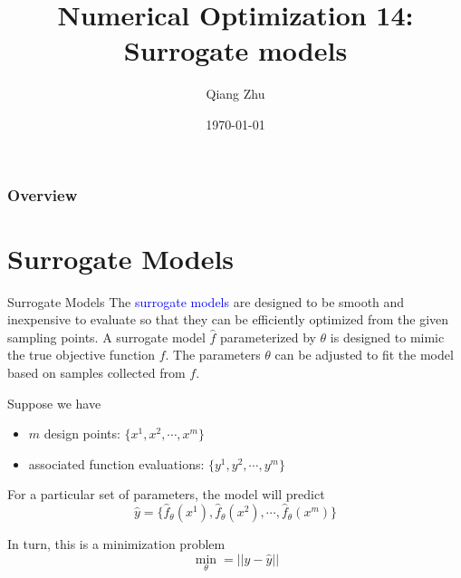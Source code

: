 \documentclass{beamer}
\title[Surrogate models]{Numerical Optimization 14: Surrogate models} %
\author{Qiang Zhu} %
\institute[University of Nevada Las Vegas] %
{
University of Nevada Las Vegas\\ %
\medskip
}
\date{\today} %
\begin{document}
\begin{frame}
\titlepage %
\end{frame}

\begin{frame}
\frametitle{Overview} %
\tableofcontents %
\end{frame}



\section{Surrogate Models}
\begin{frame}{Surrogate Models}
The \textcolor{blue}{surrogate models} are designed to be smooth and inexpensive to evaluate so that they can be efficiently optimized from the given sampling points. A surrogate model $\hat{f}$ parameterized by $\theta$ is designed to mimic the true objective function $f$. The parameters $\theta$ can be adjusted to fit the model based on samples collected from $f$. 

Suppose we have 
\begin{itemize}
    \item $m$ design points: $\{x^1, x^2, \cdots, x^m\}$
    \item associated function evaluations: $\{y^1, y^2, \cdots, y^m\}$
\end{itemize}
For a particular set of parameters, the model will predict
\begin{equation*}
    \hat{y} = \{\hat{f}_\theta(x^1), \hat{f}_\theta(x^2), \cdots, \hat{f}_\theta(x^m)\}
\end{equation*}

In turn, this is a minimization problem
\begin{equation*}
    \underset{\theta}{\min} = ||y-\hat{y}||
\end{equation*}
\end{frame}
\end{document}

